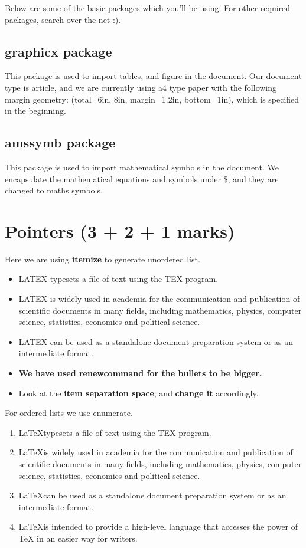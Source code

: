 \documentclass[12pt]{article}
\newcommand{\LATEX}{\LaTeX}
\begin{document}
Below are some of the basic packages which you’ll be using. For other
required packages, search over the net :).
\par


\subsection {graphicx package}
This package is used to import tables, and figure in the document. Our
document type is article, and we are currently using a4 type paper with the
following margin geometry: (total={6in, 8in}, margin=1.2in, bottom=1in),
which is specified in the beginning.

\subsection {amssymb package}
This package is used to import mathematical symbols in the document. We
encapsulate the mathematical equations and symbols under \$, and they are
changed to maths symbols.
 
\section{Pointers (3 + 2 + 1 marks)}
Here we are using \textbf{itemize} to generate unordered list.
\begin{itemize}
 
 \setlength\itemsep{1em}
	\item LATEX typesets a file of text using the TEX program.
	\item  LATEX is widely used in academia for the communication and publication of scientific documents in many fields, including mathematics, physics, computer science, statistics, economics and political science.
	\item LATEX can be used as a standalone document preparation system or as an intermediate format.
	\item \textbf{We have used renewcommand for the bullets to be bigger.}
	\item Look at the \textbf{item separation space}, and \textbf{change it} accordingly.
\end{itemize}

For ordered lists we use enumerate.

\begin{enumerate}[label=\Roman*]
\item \LATEX typesets a file of text using the TEX program.
\item \LATEX is widely used in academia for the communication and publication
of scientific documents in many fields, including mathematics, physics,
computer science, statistics, economics and political science.
\item \LaTeX can be used as a standalone document preparation system or as an
intermediate format.
\item \LATEX is intended to provide a high-level language that accesses the power
of TeX in an easier way for writers.

\end{enumerate}
\end{document}

